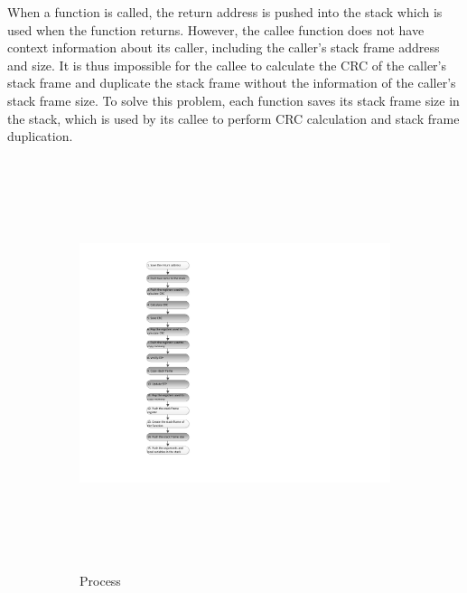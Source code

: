 When a function is called, the return address is pushed into the stack which is used when the function returns. However, the callee function does not have context information about its caller, including the caller's stack frame address and size. It is thus impossible for the callee to calculate the CRC of the caller's stack frame and duplicate the stack frame without the information of the caller's stack frame size. To solve this problem, each function saves its stack frame size in the stack, which is used by its callee to perform CRC calculation and stack frame duplication.

\begin{figure}
        \centering
        \begin{subfigure}[b]{0.5\columnwidth}
                \includegraphics[width=\textwidth, height=12cm]{figures/modified_function_operations_process_pre_execution_v2}
                \caption{Process}
                \label{fig:modified_function_operation_process_pre_execution}
        \end{subfigure}~
        \begin{subfigure}[b]{0.5\columnwidth}

\end{subfigure}
\end{figure}

